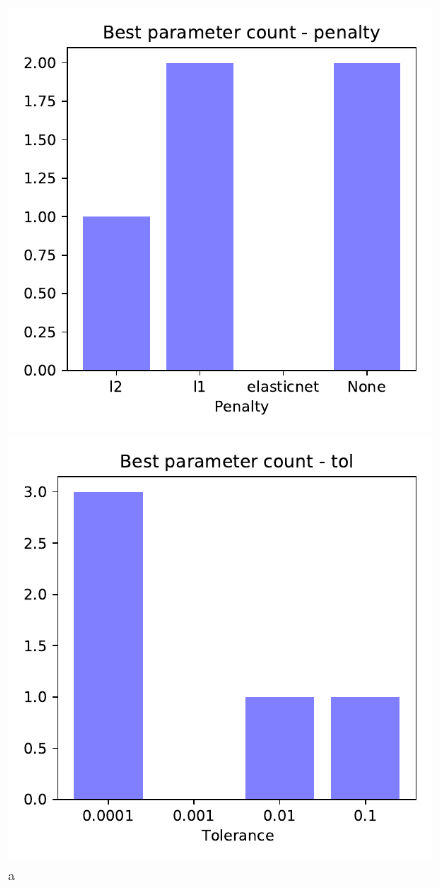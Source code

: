 \documentclass[11pt]{article}
\begin{document}
\begin{figure}[h]
\begin{minipage}[l]{0.3\textwidth}
\end{minipage}
\begin{minipage}[l]{0.3\textwidth}
\includegraphics[width=1\linewidth]{bridges/Best_parameter_count_penalty.pdf}
\end{minipage}
\begin{minipage}[l]{0.3\textwidth}
\includegraphics[width=1\linewidth]{bridges/Best_parameter_count_tol.pdf}
\end{minipage}
\caption{a}
\label{Fig:: PPN_result_parameter_grid}
\end{figure}
\end{document}
